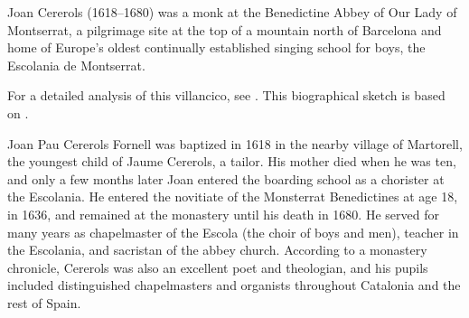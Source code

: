
\begin{notesources}

\begin{source}
\end{source}

\begin{source}
\end{source}

\begin{source}
\end{source}

\end{notesources}

Joan Cererols (1618--1680) was a monk at the Benedictine Abbey of Our Lady of
Montserrat, a pilgrimage site at the top of a mountain north of Barcelona and
home of Europe's oldest continually established singing school for boys, the
Escolania de Montserrat.%
\begin{Footnote}
    For a detailed analysis of this villancico, see 
    \autocite[227--284]{Cashner:PhD}.
    This biographical sketch is based on 
    \autocites{Estrada:CererolsBio}{Balanza:CererolsFamily}.
\end{Footnote}
Joan Pau Cererols Fornell was baptized in 1618 in the nearby village of
Martorell, the youngest child of Jaume Cererols, a tailor.
His mother died when he was ten, and only a few months later Joan entered the
boarding school as a chorister at the Escolania.
He entered the novitiate of the Monsterrat Benedictines at age 18, in 1636, and
remained at the monastery until his death in 1680.
He served for many years as chapelmaster of the Escola (the choir of boys and
men), teacher in the Escolania, and sacristan of the abbey church.
According to a monastery chronicle, Cererols was also an excellent poet and
theologian, and his pupils included distinguished chapelmasters and organists
throughout Catalonia and the rest of Spain.

